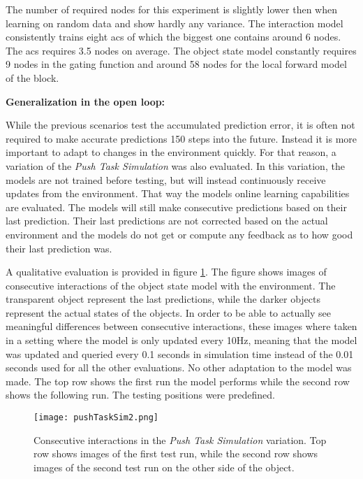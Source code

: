 The number of required nodes for this experiment is slightly lower then when learning on random data and show hardly any variance. The interaction model consistently trains eight \glspl{ac} of which the biggest one contains around 6 nodes. The \gls{acs} requires 3.5 nodes on average. 
The object state model constantly requires 9 nodes in the gating function and around 58 nodes for the local forward model of the block.

\textbf{Generalization in the open loop:}

While the previous scenarios test the accumulated prediction error, it is often not required to make accurate predictions 150 steps into the future. Instead it is more important to adapt to changes in the environment quickly. For that reason, a variation of the \textit{Push Task Simulation} was also evaluated. In this variation, the models are not trained before testing, but will instead continuously receive updates from the environment. That way the models online learning capabilities are evaluated. The models will still make consecutive predictions based on their last prediction. Their last predictions are not corrected based on the actual environment and the models do not get or compute any feedback as to how good their last prediction was. 

A qualitative evaluation is provided in figure \ref{fig:pushTaskSim2}. The figure shows images of consecutive interactions of the object state model with the environment. The transparent object represent the last predictions, while the darker objects represent the actual states of the objects. In order to be able to actually see meaningful differences between consecutive interactions, these images where taken in a setting where the model is only updated every 10Hz, meaning that the model was updated and queried every 0.1 seconds in simulation time instead of the 0.01 seconds used for all the other evaluations. No other adaptation to the model was made. The top row shows the first run the model performs while the second row shows the following run. The testing positions were predefined.

\begin{figure}
\centering
\texttt{[image: pushTaskSim2.png]}
\caption{Consecutive interactions in the \textit{Push Task Simulation} variation. Top row shows images of the first test run, while the second row shows images of the second test run on the other side of the object. }
\label{fig:pushTaskSim2}
\end{figure}

